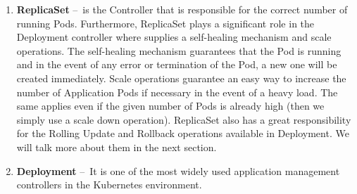 \begin{enumerate}
    \item \textbf{ReplicaSet} \---\ is the Controller that is responsible for the correct number of running Pods. Furthermore, ReplicaSet plays a significant role in the Deployment controller where supplies a self-healing mechanism and scale operations. The self-healing mechanism guarantees that the Pod is running and in the event of any error or termination of the Pod, a new one will be created immediately. Scale operations guarantee an easy way to increase the number of Application Pods if necessary in the event of a heavy load. The same applies even if the given number of Pods is already high (then we simply use a scale down operation). ReplicaSet also has a great responsibility for the Rolling Update and Rollback operations available in Deployment. We will talk more about them in the next section.

    \item \textbf{Deployment} \---\ It is one of the most widely used application management controllers in the Kubernetes environment. 
    

\end{enumerate}
